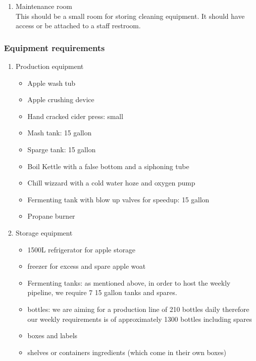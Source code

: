 \documentclass[11pt]{article}
\begin{document}
\begin{enumerate}
  \item Maintenance room\\
  This should be a small room for storing cleaning equipment. It should have access or be attached to a staff restroom.
  \end{enumerate}

    \subsubsection{Equipment requirements}
    \begin{enumerate}
    \item Production equipment
      \begin{itemize}
      \item Apple wash tub
      \item Apple crushing device
      \item Hand cracked cider press: small
      \item Mash tank: 15 gallon
      \item Sparge tank: 15 gallon
      \item Boil Kettle with a false bottom and a siphoning tube
      \item Chill wizzard with a cold water hoze and oxygen pump
      \item Fermenting tank with blow up valves for speedup: 15 gallon
      \item Propane burner
      \end{itemize}

    \item Storage equipment
      \begin{itemize}
      \item 1500L refrigerator for apple storage
      \item freezer for excess and spare apple woat
      \item Fermenting tanks: as mentioned above, in order to host the weekly pipeline, we require 7 15 gallon tanks and spares.
      \item bottles: we are aiming for a production line of 210 bottles daily therefore our weekly requirements is of approximately 1300 bottles including spares
      \item boxes and labels
      \item shelves or containers ingredients (which come in their own boxes)
      \end{itemize}


\end{enumerate}
\end{document}
